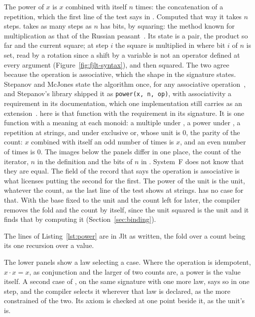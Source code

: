 The power of $x$ is $x$ combined with itself $n$ times: the concatenation of a repetition, which the first line of the test says in \Cpp{}.
Computed that way it takes $n$ steps.
 takes as many steps as $n$ has bits, by squaring: the method known for multiplication as that of the Russian peasant~\cite[\S 4.6.3]{knuth1997art2}.
Its state is a pair, the product so far and the current square; at step $i$ the square is multiplied in where bit $i$ of $n$ is set, read by a rotation since a shift by a variable is not an operator defined at every argument (Figure~\ref{fig:fjlt-syntax}), and then squared.
The two agree because the operation is associative, which the shape in the signature states.
Stepanov and McJones state the algorithm once, for any associative operation~\cite[Ch.~3]{stepanov2009elements}, and Stepanov's library shipped it as \texttt{power(x, n, op)}, with associativity a requirement in its documentation, which one implementation still carries as an extension~\cite{libstdcxx2024extnumeric}.
 here is that function with the requirement in its signature.
It is one function with a meaning at each monoid: a multiple under \cppinline{+}, a power under \cppinline{*}, a repetition at strings, and under exclusive or, whose unit is $0$, the parity of the count: $x$ combined with itself an odd number of times is $x$, and an even number of times is $0$.
The images below the panels differ in one place, the count of the iterator, $n$ in the definition and the bits of $n$ in .
System~F does not know that they are equal.
The field of the record that says the operation is associative is what licenses putting the second for the first.
The power of the unit is the unit, whatever the count, as the last line of the test shows at strings.
 has no case for that.
With the base fixed to the unit and the count left for later, the compiler removes the fold and the count by itself, since the unit squared is the unit and it finds that by computing it (Section~\ref{sec:binding}).

The lines of Listing~\ref{lst:power} are in Jlt as written, the fold over a count being its one recursion over a value.

The lower panels show a law selecting a case.
Where the operation is idempotent, $x \cdot x = x$, as conjunction and the larger of two counts are, a power is the value itself.
A second case of , on the same signature with one more law, says so in one step, and the compiler selects it wherever that law is declared, as the more constrained of the two.
Its axiom is checked at one point beside it, as the unit's is.

